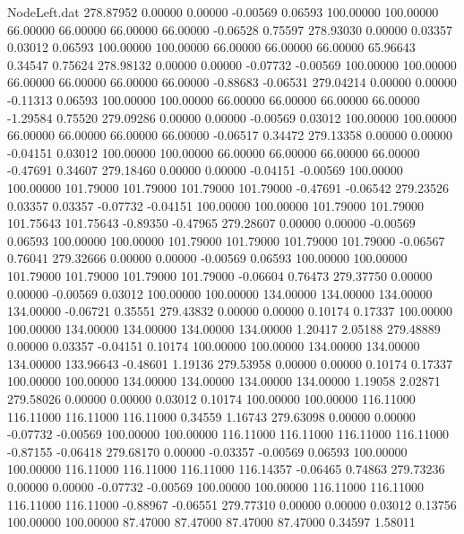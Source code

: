 \begin{filecontents}{NodeLeft.dat}
 278.87952    0.00000    0.00000    -0.00569    0.06593  100.00000  100.00000   66.00000   66.00000   66.00000   66.00000   -0.06528    0.75597
 278.93030    0.00000    0.03357     0.03012    0.06593  100.00000  100.00000   66.00000   66.00000   66.00000   65.96643    0.34547    0.75624
 278.98132    0.00000    0.00000    -0.07732   -0.00569  100.00000  100.00000   66.00000   66.00000   66.00000   66.00000   -0.88683   -0.06531
 279.04214    0.00000    0.00000    -0.11313    0.06593  100.00000  100.00000   66.00000   66.00000   66.00000   66.00000   -1.29584    0.75520
 279.09286    0.00000    0.00000    -0.00569    0.03012  100.00000  100.00000   66.00000   66.00000   66.00000   66.00000   -0.06517    0.34472
 279.13358    0.00000    0.00000    -0.04151    0.03012  100.00000  100.00000   66.00000   66.00000   66.00000   66.00000   -0.47691    0.34607
 279.18460    0.00000    0.00000    -0.04151   -0.00569  100.00000  100.00000  101.79000  101.79000  101.79000  101.79000   -0.47691   -0.06542
 279.23526    0.03357    0.03357    -0.07732   -0.04151  100.00000  100.00000  101.79000  101.79000  101.75643  101.75643   -0.89350   -0.47965
 279.28607    0.00000    0.00000    -0.00569    0.06593  100.00000  100.00000  101.79000  101.79000  101.79000  101.79000   -0.06567    0.76041
 279.32666    0.00000    0.00000    -0.00569    0.06593  100.00000  100.00000  101.79000  101.79000  101.79000  101.79000   -0.06604    0.76473
 279.37750    0.00000    0.00000    -0.00569    0.03012  100.00000  100.00000  134.00000  134.00000  134.00000  134.00000   -0.06721    0.35551
 279.43832    0.00000    0.00000     0.10174    0.17337  100.00000  100.00000  134.00000  134.00000  134.00000  134.00000    1.20417    2.05188
 279.48889    0.00000    0.03357    -0.04151    0.10174  100.00000  100.00000  134.00000  134.00000  134.00000  133.96643   -0.48601    1.19136
 279.53958    0.00000    0.00000     0.10174    0.17337  100.00000  100.00000  134.00000  134.00000  134.00000  134.00000    1.19058    2.02871
 279.58026    0.00000    0.00000     0.03012    0.10174  100.00000  100.00000  116.11000  116.11000  116.11000  116.11000    0.34559    1.16743
 279.63098    0.00000    0.00000    -0.07732   -0.00569  100.00000  100.00000  116.11000  116.11000  116.11000  116.11000   -0.87155   -0.06418
 279.68170    0.00000   -0.03357    -0.00569    0.06593  100.00000  100.00000  116.11000  116.11000  116.11000  116.14357   -0.06465    0.74863
 279.73236    0.00000    0.00000    -0.07732   -0.00569  100.00000  100.00000  116.11000  116.11000  116.11000  116.11000   -0.88967   -0.06551
 279.77310    0.00000    0.00000     0.03012    0.13756  100.00000  100.00000   87.47000   87.47000   87.47000   87.47000    0.34597    1.58011

\end{filecontents}

